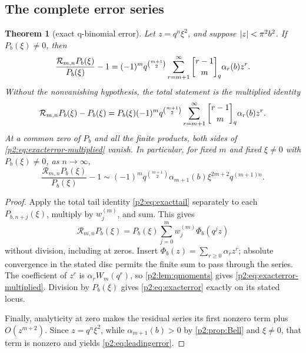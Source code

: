 \documentclass[11pt,oneside]{article}
\numberwithin{equation}{section}
\newtheorem{theorem}{Theorem}[section]
\theoremstyle{definition}
\theoremstyle{remark}
\begin{document}
\subsection{The complete error series}

\begin{theorem}[exact q-binomial error]
\label{p2:thm:exacterror}
Let \(z=q^n\xi^2\), and suppose \(\left\lvert z\right\rvert<\pi^2b^2\).  If
\(P_b(\xi)\ne0\), then
\begin{equation}
 \frac{\mathcal R_{m,n}P_b(\xi)}{P_b(\xi)}-1
 =(-1)^m q^{\binom{m+1}{2}}
 \sum_{r=m+1}^{\infty}
 \qbinomPartx{r-1}{m}\alpha_r(b)z^r.
 \label{p2:eq:exacterror}
\end{equation}
Without the nonvanishing hypothesis, the total statement is the multiplied
identity
\begin{equation}
 \mathcal R_{m,n}P_b(\xi)-P_b(\xi)
 =P_b(\xi)(-1)^m q^{\binom{m+1}{2}}
 \sum_{r=m+1}^{\infty}
 \qbinomPartx{r-1}{m}\alpha_r(b)z^r.                         \label{p2:eq:exacterror-multiplied}
\end{equation}
At a common zero of \(P_b\) and all the finite products, both sides of
\eqref{p2:eq:exacterror-multiplied} vanish.  In particular, for fixed
\(m\) and fixed \(\xi\ne0\) with \(P_b(\xi)\ne0\), as \(n\to\infty\),
\begin{equation}
 \frac{\mathcal R_{m,n}P_b(\xi)}{P_b(\xi)}-1
 \sim (-1)^m q^{\binom{m+1}{2}}
 \alpha_{m+1}(b)\xi^{2m+2}q^{(m+1)n}.
 \label{p2:eq:leadingerror}
\end{equation}
\end{theorem}

\begin{proof}
Apply the total tail identity \eqref{p2:eq:exacttail} separately to each
\(P_{b,n+j}(\xi)\), multiply by \(w_j^{(m)}\), and sum.  This gives
\[
 \mathcal R_{m,n}P_b(\xi)
 =P_b(\xi)\sum_{j=0}^m w_j^{(m)}\Phi_b(q^jz)
\]
without division, including at zeros.  Insert
\(\Phi_b(z)=\sum_{r\geq0}\alpha_rz^r\); absolute convergence in the stated
disc permits the finite sum to pass through the series.  The coefficient of
\(z^r\) is \(\alpha_rW_m(q^r)\), so \cref{p2:lem:qmoments} gives
\eqref{p2:eq:exacterror-multiplied}.  Division by \(P_b(\xi)\) gives
\eqref{p2:eq:exacterror} exactly on its stated locus.

Finally, analyticity at zero makes the residual series its first nonzero term
plus \(O(z^{m+2})\).  Since \(z=q^n\xi^2\), while
\(\alpha_{m+1}(b)>0\) by \cref{p2:prop:Bell} and \(\xi\ne0\), that term is
nonzero and yields \eqref{p2:eq:leadingerror}.
\end{proof}
\end{document}
